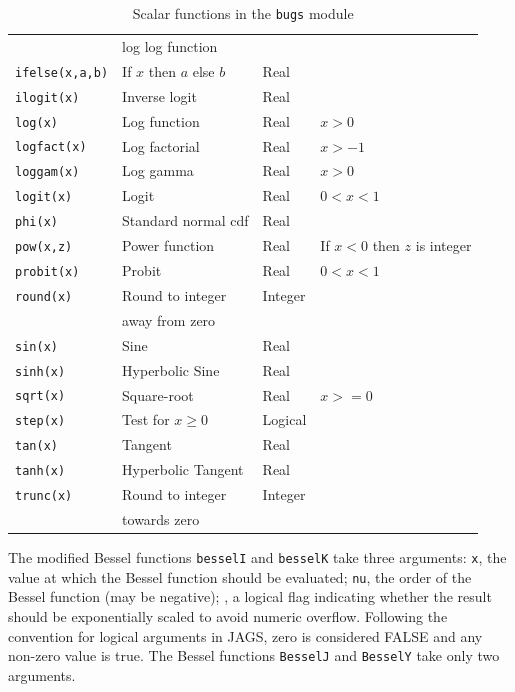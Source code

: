 \documentclass[11pt, a4paper, titlepage]{report}
\begin{document}
\begin{table}
\begin{center}
\begin{tabular}{llll}
                    & log log function    & \\
\verb+ifelse(x,a,b)+ & If $x$ then $a$ else $b$ & Real & \\
\verb+ilogit(x)+    & Inverse logit       & Real & \\
\verb+log(x)+       & Log function        & Real & $x > 0$ \\
\verb+logfact(x)+   & Log factorial       & Real & $x > -1$ \\
\verb+loggam(x)+    & Log gamma           & Real & $x > 0$ \\
\verb+logit(x)+     & Logit               & Real & $0 < x < 1$ \\
\verb+phi(x)+       & Standard normal cdf & Real & \\
\verb+pow(x,z)+     & Power function      & Real & If $x < 0$ then $z$ is integer \\ 
\verb+probit(x)+    & Probit              & Real & $0 < x < 1$ \\
\verb+round(x)+     & Round to integer    & Integer & \\
                    & away from zero      &      & \\
\verb+sin(x)+       & Sine                & Real & \\
\verb+sinh(x)+      & Hyperbolic Sine     & Real & \\
\verb+sqrt(x)+      & Square-root         & Real & $x >= 0$ \\
\verb+step(x)+      & Test for $x \geq 0$ & Logical & \\
\verb+tan(x)+       & Tangent             & Real & \\
\verb+tanh(x)+      & Hyperbolic Tangent  & Real & \\
\verb+trunc(x)+     & Round to integer    & Integer & \\
                    & towards zero        & \\
\hline
\end{tabular}
\caption{Scalar functions in the \texttt{bugs} module \label{table:bugs:scalar}}
\end{center}
\end{table}

The modified Bessel functions \texttt{besselI} and \texttt{besselK}
take three arguments: \texttt{x}, the value at which the Bessel
function should be evaluated; \texttt{nu}, the order of the Bessel
function (may be negative); , a logical flag indicating
whether the result should be exponentially scaled to avoid numeric
overflow. Following the convention for logical arguments in JAGS, zero
is considered FALSE and any non-zero value is true. The Bessel functions
\texttt{BesselJ} and \texttt{BesselY} take only two arguments.
\end{document}
